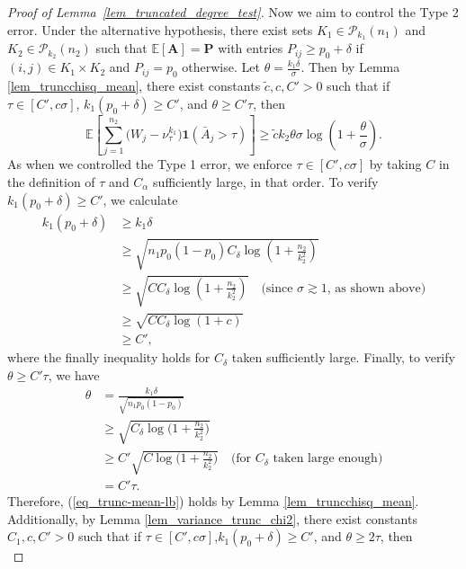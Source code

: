 \documentclass{article}
\newcommand{\A}{\mathbf{A}}
\newcommand{\bP}{\mathbf{P}}
\newcommand{\EE}{\mathbb{E}}
\newcommand{\one}{\mathbf{1}}
\begin{document}
\begin{proof}[Proof of Lemma~\ref{lem_truncated_degree_test}]
    Now we aim to control the Type 2 error. Under the alternative hypothesis, there exist sets $K_1 \in \mathcal P_{k_1}(n_1)$ and $K_2 \in \mathcal P_{k_2}(n_2)$ such that $\EE[\A] = \bP$ with entries $P_{ij} \geq p_0 + \delta$ if $(i,j) \in K_1 \times K_2$ and $P_{ij} = p_0$ otherwise. Let $\theta = \frac{k_1 \delta}{\sigma}$. Then by Lemma \ref{lem_truncchisq_mean}, there exist constants $\tilde{c}, c, C' > 0$ such that if $\tau \in [C', c\sigma]$, $k_1 (p_0 + \delta) \geq C'$, and $\theta \geq C'\tau$, then
    \begin{equation}\label{eq_trunc-mean-lb}
    \EE\left[\sum_{j = 1}^{n_2}\big(W_{j} - \nu^{k_1}_{\tau}\big)\one(\bar{A}_j > \tau)\right] \geq \tilde{c}k_2\theta \sigma \log\left(1 + \frac{\theta}{\sigma}\right).
    \end{equation}  
    As when we controlled the Type 1 error, we enforce $\tau \in [C', c\sigma]$ by taking $C$ in the definition of $\tau$ and $C_\alpha$ sufficiently large, in that order. To verify $k_1(p_0 + \delta) \geq C'$, we calculate
    \begin{align*}
    k_1(p_0 + \delta) &\geq k_1\delta \\
        &\geq \sqrt{n_1 p_0(1-p_0)C_\delta \log\left(1 + \frac{n_2}{k_2^2}\right)} \\
        &\geq \sqrt{C C_\delta \log\left(1 + \frac{n_2}{k_2^2}\right)} \quad \text{(since $\sigma \gtrsim 1$, as shown above)}\\
        &\geq \sqrt{C C_\delta \log\left(1 + c\right)} \\
        &\geq C',
    \end{align*}
    where the finally inequality holds for $C_\delta$ taken sufficiently large. Finally, to verify $\theta \geq C'\tau$, we have
    \begin{align*}
        \theta &= \frac{k_1\delta}{\sqrt{n_1p_0(1 - p_0)}} \\
        &\geq \sqrt{C_\delta\log\Big(1 + \frac{n_2}{k_2^2}\Big)} \\
        &\geq C'\sqrt{C\log\Big(1 + \frac{n_2}{k_2^2}\Big)} \quad \text{(for $C_\delta$ taken large enough)} \\
        &= C'\tau.
    \end{align*}
Therefore, (\ref{eq_trunc-mean-lb}) holds by Lemma \ref{lem_truncchisq_mean}. Additionally, by Lemma \ref{lem_variance_trunc_chi2}, there exist constants $C_1, c, C' > 0$ such that if $\tau \in [C', c\sigma]$,$k_1 (p_0 + \delta) \geq C'$,  and $\theta \geq 2\tau$, then
\begin{equation}\label{eq_trunc-var-ub}

\end{equation}
\end{proof}
\end{document}
